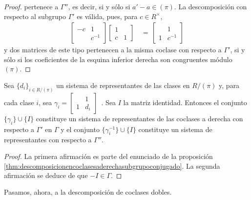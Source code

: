 \begin{proof}
	pertenece a $\Gamma''$, es decir, si y s\'{o}lo si $a'-a\in (\pi)$.
	La descomposici\'{o}n con respecto al subgrupo $\Gamma'$ es v\'{a}lida,
	pues, para $c\in R^{\times}$,
	\begin{align*}
		\begin{bmatrix} -c & 1 \\ & c^{-1} \end{bmatrix}
			\begin{bmatrix} 1 & \\ c & 1 \end{bmatrix}
		& \,=\, \begin{bmatrix} & 1 \\ 1 & c^{-1} \end{bmatrix}
	\end{align*}
	y dos matrices de este tipo pertenecen a la misma coclase con respecto
	a $\Gamma'$, si y s\'{o}lo si los coeficientes de la esquina inferior
	derecha son congruentes m\'{o}dulo $(\pi)$.
\end{proof}

\begin{coroDescomposicionEnCoclasesADerechaSubgrupoConjugado}%
	\label{coro:descomposicionencoclasesaderechasubgrupoconjugado}
	Sea $\{d_{i}\}_{i\in R/(\pi)}$ un sistema de representantes de las
	clases en $R/(\pi)$ y, para cada clase $i$, sea
	\begin{math}
		\gamma_{i}=\begin{bmatrix} & 1 \\ 1 & d_{i} \end{bmatrix}
	\end{math}~.
	Sea $I$ la matriz identidad. Entonces el conjunto
	$\{\gamma_{i}\}\cup\{I\}$ constituye un sistema de representantes de
	las coclases a derecha con respecto a $\Gamma'$ en $\Gamma$ y el
	conjunto $\{\gamma_{i}^{-1}\}\cup\{I\}$ constituye un sistema de
	representantes con respecto a $\Gamma''$.
\end{coroDescomposicionEnCoclasesADerechaSubgrupoConjugado}

\begin{proof}
	La primera afirmaci\'{o}n es parte del enunciado de la proposici\'{o}n
	\ref{thm:descomposicionencoclasesaderechasubgrupoconjugado}. La
	segunda afirmaci\'{o}n se deduce de que $-I\in\Gamma$.
\end{proof}

Pasamos, ahora, a la descomposici\'{o}n de coclases dobles.

